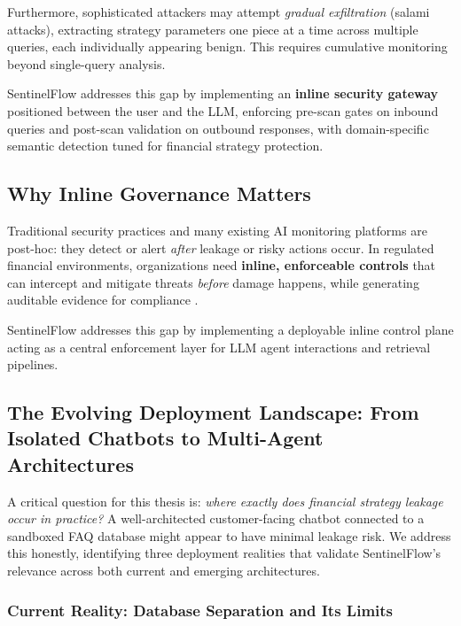 \documentclass[12pt,a4paper]{article}
\begin{document}
Furthermore, sophisticated attackers may attempt \textit{gradual exfiltration} (salami attacks), extracting strategy parameters one piece at a time across multiple queries, each individually appearing benign. This requires cumulative monitoring beyond single-query analysis.

SentinelFlow addresses this gap by implementing an \textbf{inline security gateway} positioned between the user and the LLM, enforcing pre-scan gates on inbound queries and post-scan validation on outbound responses, with domain-specific semantic detection tuned for financial strategy protection.

\subsection{Why Inline Governance Matters}

Traditional security practices and many existing AI monitoring platforms are post-hoc: they detect or alert \textit{after} leakage or risky actions occur. In regulated financial environments, organizations need \textbf{inline, enforceable controls} that can intercept and mitigate threats \textit{before} damage happens, while generating auditable evidence for compliance \cite{nist_ai_rmf, nist_ai_600_1, pipeda_guidance}.

SentinelFlow addresses this gap by implementing a deployable inline control plane acting as a central enforcement layer for LLM agent interactions and retrieval pipelines.

\subsection{The Evolving Deployment Landscape: From Isolated Chatbots to Multi-Agent Architectures}
\label{sec:deployment_landscape}

A critical question for this thesis is: \textit{where exactly does financial strategy leakage occur in practice?} A well-architected customer-facing chatbot connected to a sandboxed FAQ database might appear to have minimal leakage risk. We address this honestly, identifying three deployment realities that validate SentinelFlow's relevance across both current and emerging architectures.

\subsubsection{Current Reality: Database Separation and Its Limits}
\end{document}
